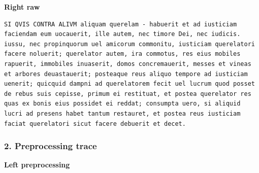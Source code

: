 \textbf{Right raw} 

\begin{lstlisting}[breaklines=true,basicstyle=\ttfamily\small]
SI QVIS CONTRA ALIVM aliquam querelam - habuerit et ad iusticiam faciendam eum uocauerit, ille autem, nec timore Dei, nec iudicis. iussu, nec propinquorum uel amicorum commonitu, iusticiam querelatori facere noluerit; querelator autem, ira commotus, res eius mobiles rapuerit, immobiles inuaserit, domos concremauerit, messes et vineas et arbores deuastauerit; posteaque reus aliquo tempore ad iusticiam uenerit; quicquid dampni ad querelatorem fecit uel lucrum quod posset de rebus suis cepisse, primum ei restituat, et postea querelator res quas ex bonis eius possidet ei reddat; consumpta uero, si aliquid lucri ad presens habet tantum restauret, et postea reus iusticiam faciat querelatori sicut facere debuerit et decet.
\end{lstlisting}

\subsubsection{2. Preprocessing trace}

\textbf{Left preprocessing} 

